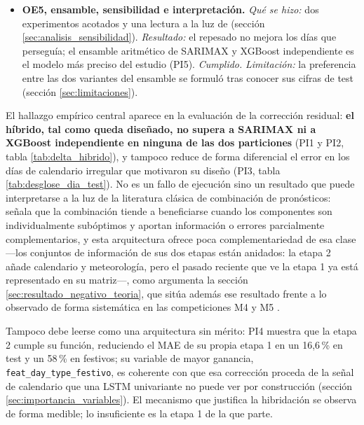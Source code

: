 \begin{itemize}
{    resultado negativo}. \emph{Limitación:}
    5 festivos y 3 puentes en test impiden concluir sobre los días irregulares.
  \item \textbf{OE5, ensamble, sensibilidad e interpretación.} \emph{Qué se hizo:} dos
    experimentos acotados y una lectura a la luz de \textcite{granger1989combining}
    (sección \ref{sec:analisis_sensibilidad}). \emph{Resultado:} el repesado no mejora los
    días que perseguía; el ensamble aritmético de SARIMAX y XGBoost independiente es el
    modelo más preciso del estudio (PI5). \emph{Cumplido.} \emph{Limitación:} la
    preferencia entre las dos variantes del ensamble se formuló tras conocer sus cifras de
    test (sección \ref{sec:limitaciones}).
\end{itemize}

El hallazgo empírico central aparece en la evaluación de la corrección residual:
\textbf{el híbrido, tal como queda diseñado, no supera a SARIMAX ni a
XGBoost independiente en ninguna de las dos particiones} (PI1 y PI2, tabla
\ref{tab:delta_hibrido}), y tampoco reduce de forma diferencial el error en los días de
calendario irregular que motivaron su diseño (PI3, tabla \ref{tab:desglose_dia_test}).
No es un fallo de ejecución sino un resultado que puede interpretarse a la luz de la
literatura clásica de combinación de pronósticos: \textcite{granger1989combining} señala
que la combinación tiende a beneficiarse cuando los componentes son individualmente
subóptimos y aportan información o errores parcialmente complementarios, y esta
arquitectura ofrece poca complementariedad de esa clase —los conjuntos de información de
sus dos etapas están anidados: la etapa 2 añade calendario y meteorología, pero el pasado
reciente que ve la etapa 1 ya está representado en su matriz—, como argumenta la sección
\ref{sec:resultado_negativo_teoria}, que sitúa
además ese resultado frente a lo observado de forma sistemática en las competiciones M4 y
M5 \parencite{makridakis2018m4,makridakis2022m5}.

Tampoco debe leerse como una arquitectura sin mérito: PI4 muestra que la etapa 2 cumple
su función, reduciendo el MAE de su propia etapa 1 en un 16,6\,\% en test y un 58\,\% en
festivos; su variable de mayor ganancia, \texttt{feat\_day\_type\_festivo}, es coherente
con que esa corrección proceda de la señal de calendario que una LSTM univariante no puede
ver por construcción (sección \ref{sec:importancia_variables}). El mecanismo que justifica
la hibridación se observa de forma medible; lo insuficiente es la etapa 1 de la que parte.


